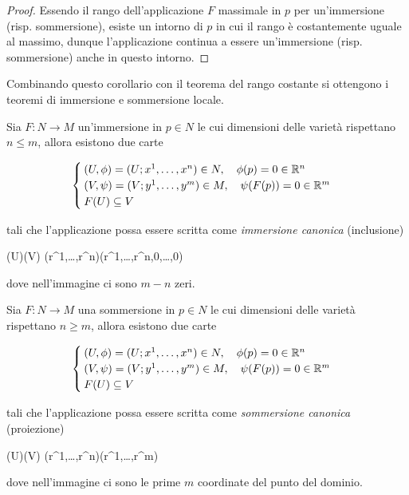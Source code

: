 \begin{proof}
	Essendo il rango dell'applicazione $ F $ massimale in $ p $ per un'immersione (risp. sommersione), esiste un intorno di $ p $ in cui il rango è costantemente uguale al massimo, dunque l'applicazione continua a essere un'immersione (risp. sommersione) anche in questo intorno.
\end{proof}

Combinando questo corollario con il teorema del rango costante si ottengono i teoremi di immersione e sommersione locale.

\begin{theorem}\label{thrm:loc-imm}
	Sia $ F : N \to M $ un'immersione in $ p \in N $ le cui dimensioni delle varietà rispettano $ n \leqslant m $, allora esistono due carte
	
	\begin{equation}
		\begin{cases}
			(U,\phi) = (U; x^{1},\dots,x^{n}) \in N \qcomma \phi(p) = 0 \in \R^{n} \\
			(V,\psi) = (V; y^{1},\dots,y^{m}) \in M \qcomma \psi(F(p)) = 0  \in \R^{m} \\
			F(U) \subseteq V
		\end{cases}
	\end{equation}
	
	tali che l'applicazione possa essere scritta come \textit{immersione canonica} (inclusione)
	
		{\phi(U)}{\psi(V)}
		{(r^{1},\dots,r^{n})}{(r^{1},\dots,r^{n},0,\dots,0)}

	dove nell'immagine ci sono $ m-n $ zeri.
\end{theorem}

\begin{theorem}\label{thrm:loc-sub}
	Sia $ F : N \to M $ una sommersione in $ p \in N $ le cui dimensioni delle varietà rispettano $ n \geqslant m $, allora esistono due carte
	
	\begin{equation}
		\begin{cases}
			(U,\phi) = (U; x^{1},\dots,x^{n}) \in N \qcomma \phi(p) = 0 \in \R^{n} \\
			(V,\psi) = (V; y^{1},\dots,y^{m}) \in M \qcomma \psi(F(p)) = 0  \in \R^{m} \\
			F(U) \subseteq V
		\end{cases}
	\end{equation}
	
	tali che l'applicazione possa essere scritta come \textit{sommersione canonica} (proiezione)
	
		{\phi(U)}{\psi(V)}
		{(r^{1},\dots,r^{n})}{(r^{1},\dots,r^{m})}
	
	dove nell'immagine ci sono le prime $ m $ coordinate del punto del dominio.
\end{theorem}

